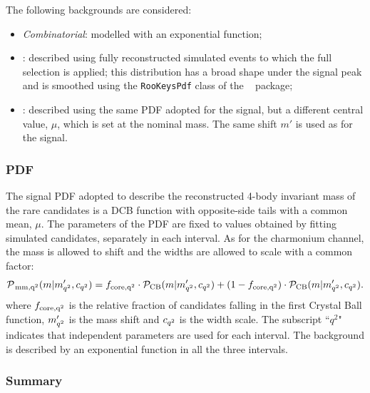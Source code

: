 The following backgrounds are considered:

\begin{itemize}

\item \textit{Combinatorial}: modelled with an exponential function;

\item \LbTopKJPsmm: described using fully reconstructed simulated events to which the full selection is applied;
this distribution has a broad shape under the signal peak and is smoothed 
using the \verb!RooKeysPdf! class of the \roofit~\cite{Verkerke:2003ir} package;

\item \BsToKstJPsmm: described using the same PDF adopted for the signal, but a different central 
value, $\mu$, which is set at the \Bs nominal mass. The same shift $m'$  is used as for the signal.

\end{itemize}


\subsubsection{\BdToKstmm PDF}

The signal PDF adopted to describe the reconstructed 4-body invariant mass of the rare \BdToKstmm candidates 
is a DCB function with opposite-side tails with a common mean, $\mu$.
The parameters of the PDF are fixed to values obtained by fitting simulated candidates, separately in each \qsq interval.
As for the charmonium channel, the mass is allowed to shift and the widths are allowed to scale with a common factor:
%
$$\mathcal{P}_{\rm \rm \,mm, {q^2}}(m | m'_{{q^2}}, c_{{q^2}}) = 
f_{\rm core, {q^2}} \cdot \mathcal{P}_{\rm CB}(m | m'_{{q^2}}, c_{{q^2}}) + 
(1 - f_{\rm core, {q^2}}) \cdot \mathcal{P}_{\rm CB}(m | m'_{{q^2}}, c_{{q^2}}).$$
%
where $f_{\rm core, {q^2}}$ is the relative fraction of candidates falling in the first Crystal Ball function, $m'_{{q^2}}$ is the mass shift and $c_{{q^2}}$ is the width scale.
The subscript ``$q^2$" indicates that independent parameters are used for each \qsq interval.
The background is described by an exponential function in all the three \qsq intervals.

\subsubsection{Summary}

